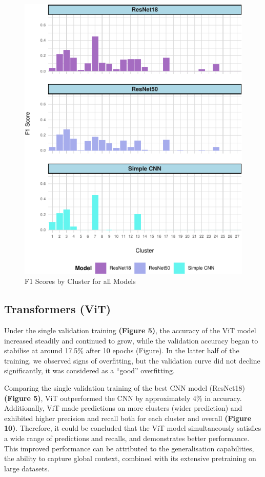 \documentclass[letterpaper,9pt,twocolumn,twoside,]{pinp}
\begin{document}
\begin{figure}[h]

{\centering \includegraphics{Image02_final_report_files/figure-latex/unnamed-chunk-3-1} 

}

\caption{F1 Scores by Cluster for all Models}\label{fig:unnamed-chunk-3}
\end{figure}

\hypertarget{transformers-vit}{%
\subsection{Transformers (ViT)}\label{transformers-vit}}

Under the single validation training \textbf{(Figure 5)}, the accuracy
of the ViT model increased steadily and continued to grow, while the
validation accuracy began to stabilise at around 17.5\% after 10 epochs
(Figure). In the latter half of the training, we observed signs of
overfitting, but the validation curve did not decline significantly, it
was considered as a ``good'' overfitting.

Comparing the single validation training of the best CNN model
(ResNet18) \textbf{(Figure 5)}, ViT outperformed the CNN by
approximately 4\% in accuracy. Additionally, ViT made predictions on
more clusters (wider prediction) and exhibited higher precision and
recall both for each cluster and overall \textbf{(Figure 10)}.
Therefore, it could be concluded that the ViT model simultaneously
satisfies a wide range of predictions and recalls, and demonstrates
better performance. This improved performance can be attributed to the
generalisation capabilities, the ability to capture global context,
combined with its extensive pretraining on large datasets.
\end{document}
